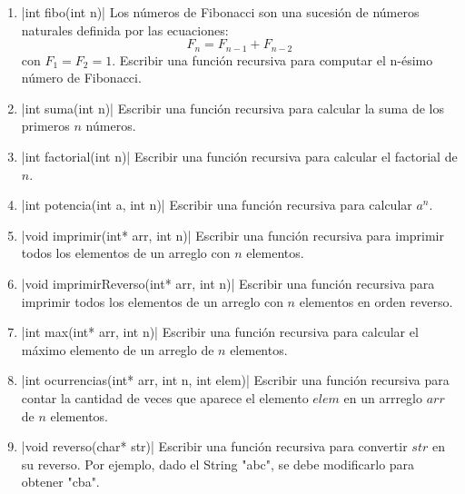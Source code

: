 \documentclass[titlepage,oneside]{book}
\begin{document}
    \begin{enumerate}
    
        \item{}|int fibo(int n)|
        Los números de Fibonacci son una sucesión de números naturales definida por las ecuaciones:
        $$F_n = F_{n-1} + F_{n-2}$$ con $F_1 = F_2 = 1$. Escribir una función recursiva para computar el n-ésimo número de Fibonacci.

         \item{}|int suma(int n)|
         Escribir una función recursiva para calcular la suma de los primeros $n$ números.

         \item{}|int factorial(int n)|
         Escribir una función recursiva para calcular el factorial de $n$.

         \item{}|int potencia(int a, int n)|
         Escribir una función recursiva para calcular $a^n$.

         \item{}|void imprimir(int* arr, int n)|
         Escribir una función recursiva para imprimir todos los elementos de un arreglo con $n$ elementos.

         \item{}|void imprimirReverso(int* arr, int n)|
         Escribir una función recursiva para imprimir todos los elementos de un arreglo con $n$ elementos en orden reverso.

         \item{}|int max(int* arr, int n)|
         Escribir una función recursiva para calcular el máximo elemento de un arreglo de $n$ elementos.

         \item{}|int ocurrencias(int* arr, int n, int elem)|
         Escribir una función recursiva para contar la cantidad de veces que aparece el elemento $elem$ en un arrreglo $arr$ de $n$ elementos.

         \item{}|void reverso(char* str)|
         Escribir una función recursiva para convertir $str$ en su reverso. Por ejemplo, dado el String "abc", se debe modificarlo para obtener "cba".

         

        


\end{enumerate}
\end{document}
